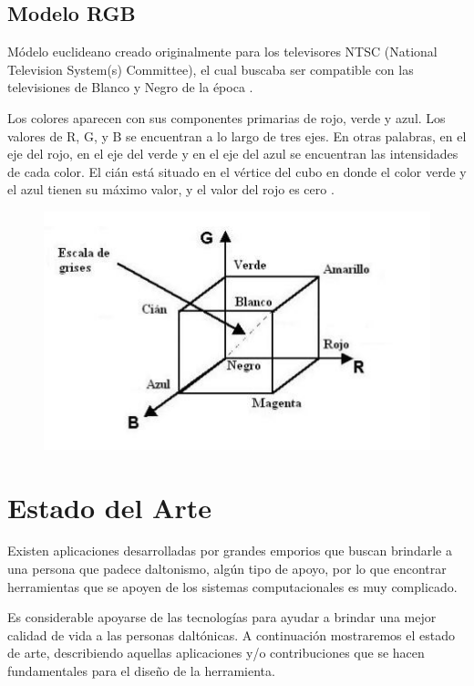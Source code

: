 \documentclass[10pt]{article}
\begin{document}
\subsection{Modelo RGB}

Módelo euclideano creado originalmente para los televisores NTSC (National Television System(s) Committee), el cual buscaba ser compatible con las televisiones de Blanco y Negro de la época \cite{IEEEreferencias:Ref16}.

Los colores aparecen con sus componentes primarias de rojo, verde y azul. Los valores de R, G, y B se encuentran a lo largo de tres ejes. En otras palabras, en el eje del rojo, en el eje del verde y en el eje del azul se encuentran las intensidades de cada color. El cián está situado en el vértice del cubo en donde el color verde y el azul tienen su máximo valor, y el valor del rojo es cero \cite{IEEEreferencias:Ref16}.
\begin{figure}[H]
	\begin{center}
\includegraphics[scale = 0.85]{Imagenes/cubo.JPG}
	\end{center} 
\end{figure}

\newpage

\section{Estado del Arte}
Existen aplicaciones desarrolladas por grandes emporios que buscan brindarle a una persona que padece daltonismo, algún tipo de apoyo, por lo que encontrar herramientas que se apoyen de los sistemas computacionales es muy complicado. 

Es considerable apoyarse de las tecnologías para ayudar a brindar una mejor calidad de vida a las personas daltónicas. A continuación mostraremos el estado de arte, describiendo aquellas aplicaciones y/o contribuciones que se hacen fundamentales para el diseño de la herramienta.
\end{document}
